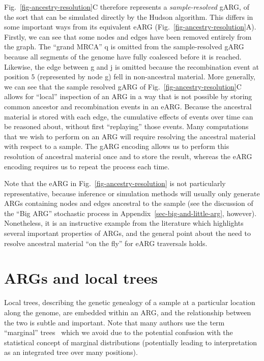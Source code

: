 \documentclass{article}
\newcommand{\noderef}[1]{\textsf{#1}}
\begin{document}
Fig.~\ref{fig-ancestry-resolution}C therefore represents a \emph{sample-resolved} gARG,
of the sort that can be simulated directly by the Hudson algorithm.
This differs in some important ways from its equivalent eARG (Fig.~\ref{fig-ancestry-resolution}A).
Firstly, we can see that some nodes and edges have been removed entirely
from the graph.
The ``grand MRCA'' \noderef{q} is omitted from the
sample-resolved gARG because all segments of the genome have
fully coalesced before it is reached. Likewise, the edge
between \noderef{g} and \noderef{j} is omitted because the recombination
event at position $5$ (represented by node \noderef{g})
fell in non-ancestral material.
More generally, we can see that the sample resolved
gARG of Fig.~\ref{fig-ancestry-resolution}C
allows for ``local'' inspection
of an ARG in a way that is not possible by storing
common ancestor and recombination events in an eARG. Because
the ancestral material is stored with each edge, the
cumulative effects of events over time can be reasoned
about, without first ``replaying'' those events. Many computations
that we wish to perform on an ARG will require resolving
the ancestral material with respect to a sample.
The gARG encoding
allows us to perform this resolution of ancestral material once
and to store the result,
whereas the eARG encoding requires us to repeat the process
each time.

Note that the \citet{wiuf1999recombination} eARG
in Fig.~\ref{fig-ancestry-resolution} is not particularly
representative, because inference or simulation methods will usually
only generate ARGs containing nodes and edges ancestral to the sample
(see the discussion of the ``Big ARG'' stochastic process in
Appendix~\ref{sec-big-and-little-arg}, however).
Nonetheless, it is an instructive example from the literature which highlights several
important properties of ARGs, and the general point about
the need to resolve ancestral material ``on the fly'' for eARG traversals
holds.

\section{ARGs and local trees}
\label{sec-ARG-and-local-trees}
Local trees, describing the genetic genealogy of a sample
at a particular location along the genome, are
embedded within an ARG, and the relationship
between the two is subtle and important.
Note that many authors use the term ``marginal''
trees~\citep[e.g.][]{griffiths1996ancestral,minichiello2006mapping,kelleher2016efficient}
which we avoid due to the potential confusion with the
statistical concept of marginal distributions
(potentially leading to interpretation as an integrated tree over many positions).
\end{document}
